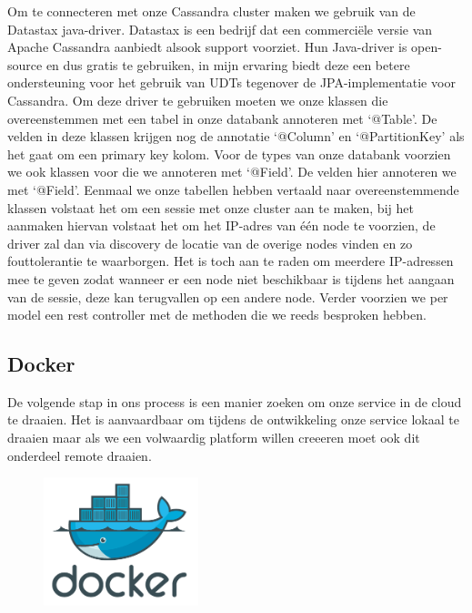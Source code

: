 \documentclass{article}
\begin{document}
\par
Om te connecteren met onze Cassandra cluster maken we gebruik van de Datastax java-driver. Datastax is een bedrijf dat een commerciële versie van Apache Cassandra aanbiedt alsook support voorziet. Hun Java-driver is open-source en dus gratis te gebruiken, in mijn ervaring biedt deze een betere ondersteuning voor het gebruik van UDTs tegenover de JPA-implementatie voor Cassandra. Om deze driver te gebruiken moeten we onze klassen die overeenstemmen met een tabel in onze databank annoteren met ‘@Table’. De velden in deze klassen krijgen nog de annotatie ‘@Column’ en ‘@PartitionKey’ als het gaat om een primary key kolom. Voor de types van onze databank voorzien we ook klassen voor die we annoteren met ‘@Field’. De velden hier annoteren we met ‘@Field’. Eenmaal we onze tabellen hebben vertaald naar overeenstemmende klassen volstaat het om een sessie met onze cluster aan te maken, bij het aanmaken hiervan volstaat het om het IP-adres van \'e\'en node te voorzien, de driver zal dan via discovery de locatie van de overige nodes vinden en zo fouttolerantie te waarborgen. Het is toch aan te raden om meerdere IP-adressen mee te geven zodat wanneer er een node niet beschikbaar is tijdens het aangaan van de sessie, deze kan terugvallen op een andere node. Verder voorzien we per model een rest controller met de methoden die we reeds besproken hebben.
\par
	\subsection{Docker}
	De volgende stap in ons process is een manier zoeken om onze service in de cloud te draaien. Het is aanvaardbaar om tijdens de ontwikkeling onze service lokaal te draaien maar als we een volwaardig platform willen creeeren moet ook dit onderdeel remote draaien.
	\par
	\begin{figure}
  	\includegraphics[width=0.4\textwidth]{images/docker-logo.PNG}
	\end{figure}
	
\end{document}
